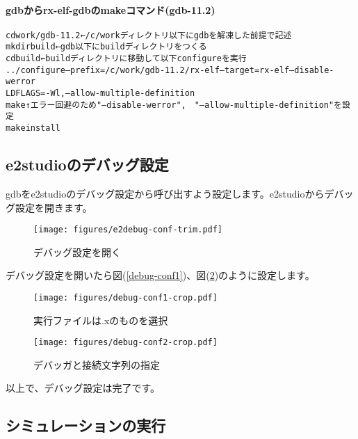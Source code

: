 \paragraph{gdbからrx-elf-gdbのmakeコマンド(gdb-11.2)}
{\small
\begin{alltt}
    cd work/gdb-11.2        ← /c/workディレクトリ以下にgdbを解凍した前提で記述
    mkdir build             ← gdb以下にbuildディレクトリをつくる
    cd build                ← buildディレクトリに移動して以下configureを実行
    ../configure --prefix=/c/work/gdb-11.2/rx-elf --target=rx-elf --disable-werror
     LDFLAGS=-Wl, --allow-multiple-definition
    make                ↑エラー回避のため"--disable-werror",　"--allow-multiple-definition"を設定
    make install
\end{alltt}
}

\newpage
\subsection{e2studioのデバッグ設定}
gdbをe2studioのデバッグ設定から呼び出すよう設定します。e2studioからデバッグ設定を開きます。
\begin{figure}[htbp!]
\begin{center}
\texttt{[image: figures/e2debug-conf-trim.pdf]}
\end{center}
\caption{デバッグ設定を開く}
\label{e2debug-conf}
\end{figure}

デバッグ設定を開いたら図(\ref{debug-conf1})、図(\ref{debug-conf2})のように設定します。
\begin{figure}[htbp!]
 \begin{minipage}{0.5\hsize}
  \begin{center}
   \texttt{[image: figures/debug-conf1-crop.pdf]}
  \end{center}
  \caption{実行ファイルは.xのものを選択}
  \label{debug-conf1}
 \end{minipage}
 \begin{minipage}{0.5\hsize}
  \begin{center}
   \texttt{[image: figures/debug-conf2-crop.pdf]}
  \end{center}
  \caption{デバッガと接続文字列の指定}
  \label{debug-conf2}
 \end{minipage}
\end{figure}
以上で、デバッグ設定は完了です。

\newpage
\subsection{シミュレーションの実行}
